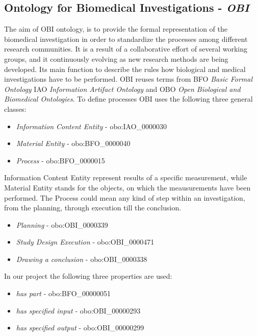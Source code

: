 \subsection{Ontology for Biomedical Investigations - \textit{OBI}} \label{obi}


The aim of OBI ontology, is to provide the formal representation of the biomedical investigation in order to standardize the processes among different research communities. It is a result of a collaborative effort of several working groups, and it continuously evolving as new research methods are being developed. Its main function to describe the rules how biological and medical investigations have to be performed. OBI reuses terms from BFO \textit{Basic Formal Ontology} IAO \textit{Information Artifact Ontology} and  OBO \textit{Open Biological and Biomedical Ontologies}\cite{10.1371/journal.pone.0154556}. To define processes OBI uses the following three general classes:

\begin{itemize}
	\item  \textit{Information Content Entity} - obo:IAO\_0000030
	\item  \textit{Material Entity} - obo:BFO\_0000040
	\item  \textit{Process} - obo:BFO\_0000015
\end{itemize}

Information Content Entity represent results of a specific measurement, while Material Entity stands for the objects, on which the meausurements have been performed. 
The Process could mean any kind of step within an investigation, from the planning, through execution till the conclusion.

\begin{itemize}
	\item  \textit{Planning} - obo:OBI\_0000339
	\item  \textit{Study Design Execution} - obo:OBI\_0000471
	\item  \textit{Drawing a conclusion} - obo:OBI\_0000338
\end{itemize}


In our project the following three properties are used:

\begin{itemize}
	\item  \textit{has part} - obo:BFO\_00000051
	\item  \textit{has specified input} - obo:OBI\_00000293
	\item  \textit{has specified output} - obo:OBI\_00000299
\end{itemize}


